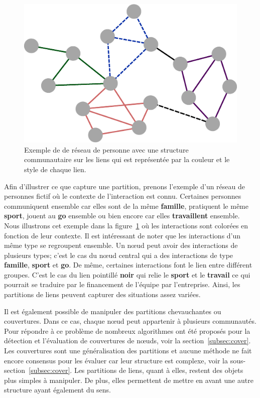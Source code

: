 \begin{figure}
\centering
\includegraphics[width=0.5\linewidth]{img/ExpectedNodes/Link_Partition}
\caption{Exemple de de réseau de personne avec une structure communautaire sur les liens qui est représentée par la couleur et le style de chaque lien.}
\label{fig:linkpartition_exemple_expected}
\end{figure}
Afin d'illustrer ce que capture une partition, prenons l'exemple d'un réseau de personnes fictif où le contexte de l'interaction est connu.
Certaines personnes communiquent ensemble car elles sont de la même \textbf{\textcolor{bleu_random}{famille}}, pratiquent le même \textbf{\textcolor{rose_cochon}{sport}}, jouent au \textbf{\textcolor{vert_fonce}{go}} ensemble ou bien encore car elles \textbf{\textcolor{violet_cool}{travaillent}} ensemble.
Nous illustrons cet exemple dans la figure~\ref{fig:linkpartition_exemple_expected} où les interactions sont colorées en fonction de leur contexte.
Il est intéressant de noter que les interactions d'un même type se regroupent ensemble.
Un n\oe ud peut avoir des interactions de plusieurs types; c'est le cas du n\oe ud central qui a des interactions de type \textbf{\textcolor{bleu_random}{famille}}, \textbf{\textcolor{rose_cochon}{sport}} et \textbf{\textcolor{vert_fonce}{go}}.
De même, certaines interactions font le lien entre différent groupes.
C'est le cas du lien pointillé \textbf{noir} qui relie le \textbf{\textcolor{rose_cochon}{sport}} et le \textbf{\textcolor{violet_cool}{travail}} ce qui pourrait se traduire par le financement de l'équipe par l'entreprise.
Ainsi, les partitions de liens peuvent capturer des situations assez variées.

Il est également possible de manipuler des partitions chevauchantes ou couvertures.
Dans ce cas, chaque n\oe ud peut appartenir à plusieurs communautés.
Pour répondre à ce problème de nombreux algorithmes ont été proposés pour la détection et l'évaluation de couvertures de n\oe uds, voir la section~\ref{subsec:cover}.
Les couvertures sont une généralisation des partitions et aucune méthode ne fait encore consensus pour les évaluer car leur structure est complexe, voir la sous-section~\ref{subsec:cover}.
Les partitions de liens, quant à elles, restent des objets plus simples à manipuler.
De plus, elles permettent de mettre en avant une autre structure ayant également du sens.



